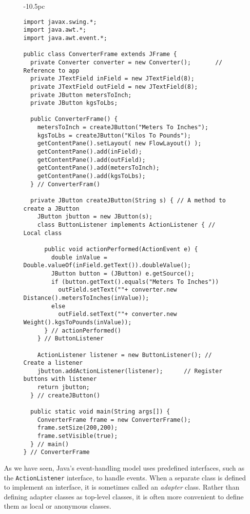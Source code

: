 \begin{figure}[h!]
\jjjprogstart
\begin{jjjlistingleft}[36.5pc]{-10.5pc}
\begin{lstlisting}
import javax.swing.*;
import java.awt.*;
import java.awt.event.*;

public class ConverterFrame extends JFrame {
  private Converter converter = new Converter();       // Reference to app
  private JTextField inField = new JTextField(8);
  private JTextField outField = new JTextField(8);
  private JButton metersToInch;
  private JButton kgsToLbs;

  public ConverterFrame() {
    metersToInch = createJButton("Meters To Inches");
    kgsToLbs = createJButton("Kilos To Pounds");
    getContentPane().setLayout( new FlowLayout() );
    getContentPane().add(inField);
    getContentPane().add(outField);
    getContentPane().add(metersToInch);
    getContentPane().add(kgsToLbs);
  } // ConverterFram()

  private JButton createJButton(String s) { // A method to create a JButton
    JButton jbutton = new JButton(s);
    class ButtonListener implements ActionListener { // Local class

      public void actionPerformed(ActionEvent e) {
        double inValue = Double.valueOf(inField.getText()).doubleValue();
        JButton button = (JButton) e.getSource();
        if (button.getText().equals("Meters To Inches"))
          outField.setText(""+ converter.new Distance().metersToInches(inValue));
        else
          outField.setText(""+ converter.new Weight().kgsToPounds(inValue));
      } // actionPerformed()
    } // ButtonListener

    ActionListener listener = new ButtonListener(); // Create a listener
    jbutton.addActionListener(listener);      // Register buttons with listener
    return jbutton;
  } // createJButton()

  public static void main(String args[]) {
    ConverterFrame frame = new ConverterFrame();
    frame.setSize(200,200);
    frame.setVisible(true);
  } // main()
} // ConverterFrame
\end{lstlisting}
\end{jjjlistingleft}
\end{figure}

\noindent As we have seen, Java's event-handling model uses predefined
interfaces, such as the {\tt ActionListener} interface, to handle
events.  When a separate class is defined to implement an interface, it
is sometimes called an {\it adapter} class.  Rather than defining
adapter classes as top-level classes, it is often more convenient to
define them as local or anonymous classes.   


